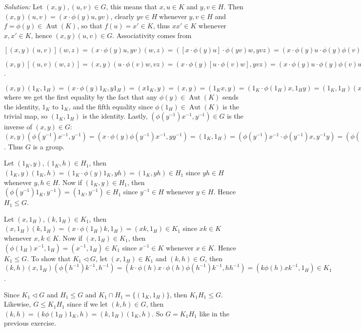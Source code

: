 \documentclass{letter}
\newcommand{\tmem}[1]{{\em #1\/}}
\newcommand{\tmop}[1]{\ensuremath{\operatorname{#1}}}
\begin{document}
{\tmem{Solution:}} Let $(x, y), (u, v) \in G$, this means that $x, u \in K$
and $y, v \in H$. Then $(x, y) (u, v) = (x \cdot \phi (y) u, y v)$, clearly $y
v \in H \tmop{whenever} y, v \in H$ and $f = \phi (y) \in \tmop{Aut} (K)$, so
that $f (u) = x' \in K$, thus $x x' \in K$ whenever $x, x' \in K$, hence $(x,
y) (u, v) \in G$. Associativity comes from

$[(x, y) (u, v)] (w, z) = (x \cdot \phi (y) u, y v) (w, z) = ([x \cdot \phi
(y) u] \cdot \phi (y v) w, y v z) = (x \cdot \phi (y) u \cdot \phi (y) \phi
(v) w, y v z)$

$(x, y) [(u, v) (w, z)] = (x, y) (u \cdot \phi (v) w, v z) = (x \cdot \phi (y)
[u \cdot \phi (v) w], y v z) = (x \cdot \phi (y) u \cdot \phi (y) \phi (v) w,
y v z)$.

$(x, y) (1_K, 1_H) = (x \cdot \phi (y) 1_K, y 1_H) = (x 1_K, y) = (x, y) =
(1_K x, y) = (1_K \cdot \phi (1_H) x, 1_H y) = (1_K, 1_H) (x, y)$ where we get
the first equality by the fact that any $\phi (y) \in \tmop{Aut} (K)$ sends
the identity, $1_K$ to $1_K$, and the fifth equality since $\phi (1_H) \in
\tmop{Aut} (K)$ is the trivial map, so $(1_K, 1_H)$ is the identity. Lastly,
$(\phi (y^{- 1}) x^{- 1}, y^{- 1}) \in G$ is the inverse of $(x, y) \in G$:
$(x, y) (\phi (y^{- 1}) x^{- 1}, y^{- 1}) = (x \cdot \phi (y) \phi (y^{- 1})
x^{- 1}, y y^{- 1}) = (1_K, 1_H) = (\phi (y^{- 1}) x^{- 1} \cdot \phi (y^{-
1}) x, y^{- 1} y) = (\phi (y^{- 1}) x^{- 1}, y^{- 1}) (x, y)$. Thus $G$ is a
group.

Let $(1_K, y), (1_K, h) \in H_1$, then $(1_K, y) (1_K, h) = (1_K \cdot \phi
(y) 1_K, y h) = (1_K, y h) \in H_1$ since $y h \in H$ whenever $y, h \in H$.
Now if $(1_K, y) \in H_1$, then $(\phi (y^{- 1}) 1_K, y^{- 1}) = (1_K, y^{-
1}) \in H_1$ since $y^{- 1} \in H$ whenever $y \in H$. Hence $H_1 \leq G$.

Let $(x, 1_H), (k, 1_H) \in K_1$, then $(x, 1_H) (k, 1_H) = (x \cdot \phi
(1_H) k, 1_H) = (x k, 1_H) \in K_1$ since $x k \in K$ whenever $x, k \in K$.
Now if $(x, 1_H) \in K_1$, then $(\phi (1_H) x^{- 1}, 1_H) = (x^{- 1}, 1_H)
\in K_1$ since $x^{- 1} \in K$ whenever $x \in K$. Hence $K_1 \leq G$. To show
that $K_1 \vartriangleleft G$, let $(x, 1_H) \in K_1$ and $(k, h) \in G$, then
$(k, h) (x, 1_H) (\phi (h^{- 1}) k^{- 1}, h^{- 1}) = (k \cdot \phi (h) x \cdot
\phi (h) \phi (h^{- 1}) k^{- 1}, h h^{- 1}) = (k \phi (h) x k^{- 1}, 1_H) \in
K_1$.

Since $K_1 \vartriangleleft G$ and $H_1 \leq G$ and $K_1 \cap H_1 =\{(1_K,
1_H)\}$, then $K_1 H_1 \leq G$. Likewise, $G \leq K_1 H_1$ since if we let
$(k, h) \in G$, then $(k, h) = (k \phi (1_H) 1_K, h) = (k, 1_H) (1_K, h)$. So
$G = K_1 H_1$ like in the previous exercise.
\end{document}
